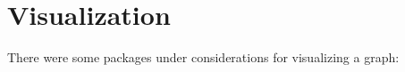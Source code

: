 \documentclass[a4paper]{article}
\begin{document}







\section{Visualization}
There were some packages under considerations for visualizing a
graph:
\end{document}
